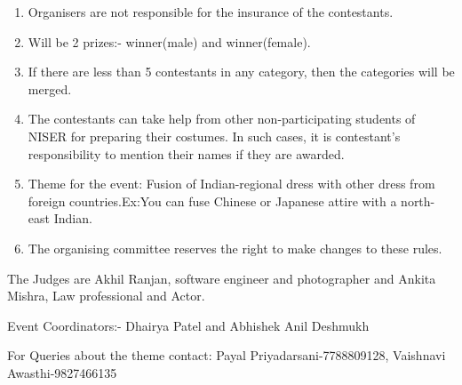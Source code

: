 \documentclass[a4paper, 11pt]{proc}
\begin{document}
\begin{enumerate}
	\item Organisers are not responsible for the insurance of the contestants.
	\item Will be 2 prizes:- winner(male) and winner(female).
	\item If there are less than 5 contestants in any category, then the categories will be merged.
	\item The contestants can take help from other non-participating students of NISER for preparing their costumes. In such cases, it is contestant's responsibility to mention their names if they are awarded.
	\item Theme for the event: Fusion of Indian-regional dress with other dress from foreign countries.Ex:You can fuse Chinese or Japanese attire with a north-east Indian.
	\item The organising committee reserves the right to make changes to these rules.
\end{enumerate}
The Judges are Akhil Ranjan, software engineer and photographer and Ankita Mishra, Law professional and Actor.

Event Coordinators:- Dhairya Patel and Abhishek Anil Deshmukh

For Queries about the theme contact: Payal Priyadarsani-7788809128, Vaishnavi Awasthi-9827466135
\end{document}
